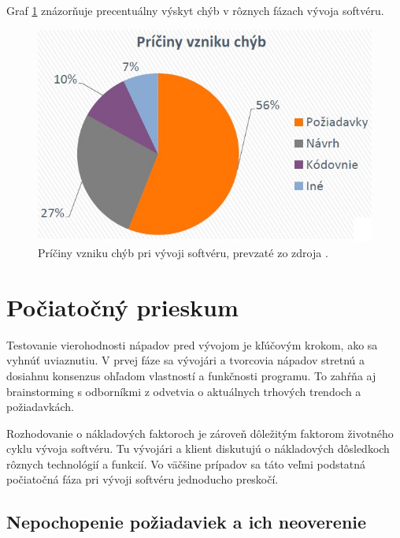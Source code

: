 \documentclass[10pt,twoside,slovak,a4paper]{article}
\begin{document}
\pagebreak
Graf \ref{fig:D2} znázorňuje precentuálny výskyt chýb v rôznych fázach vývoja softvéru.

\begin{figure}[h]
    \centering
    \includegraphics[scale=0.35]{priciny_chyb.jpg}
    \caption{Príčiny vzniku chýb pri vývoji softvéru, prevzaté zo zdroja \cite{VyvojProces}.}
    \label{fig:D2}
\end{figure}


\section{Počiatočný prieskum}
Testovanie vierohodnosti nápadov pred vývojom je kľúčovým krokom, ako sa vyhnúť uviaznutiu. V prvej fáze sa vývojári a tvorcovia nápadov stretnú a dosiahnu konsenzus ohľadom vlastností a funkčnosti programu. To zahŕňa aj brainstorming s odborníkmi z odvetvia o aktuálnych trhových trendoch a požiadavkách. 

Rozhodovanie o nákladových faktoroch je zároveň dôležitým faktorom životného cyklu vývoja softvéru. Tu vývojári a klient diskutujú o nákladových dôsledkoch rôznych technológií a funkcií. Vo väčšine prípadov sa táto veľmi podstatná počiatočná fáza pri vývoji softvéru jednoducho preskočí.

\subsection{Nepochopenie požiadaviek a ich neoverenie}
\end{document}
